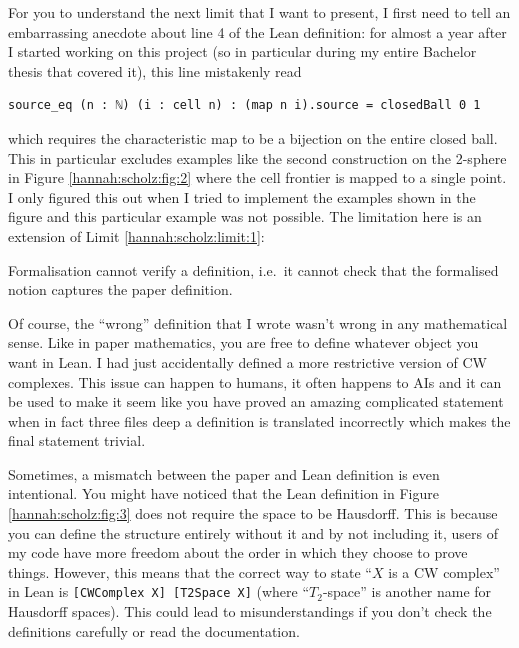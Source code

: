 
For you to understand the next limit that I want to present, I first need to tell an embarrassing anecdote about line 4 of the Lean definition: for almost a year after I started working on this project (so in particular during my entire Bachelor thesis that covered it), this line mistakenly read 
\begin{lstlisting}[language=lean]
source_eq (n : ℕ) (i : cell n) : (map n i).source = closedBall 0 1
\end{lstlisting}
which requires the characteristic map to be a bijection on the entire closed ball. This in particular excludes examples like the second construction on the 2-sphere in Figure \ref{hannah:scholz:fig:2} where the cell frontier is mapped to a single point. 
I only figured this out when I tried to implement the examples shown in the figure and this particular example was not possible. 
The limitation here is an extension of Limit \ref{hannah:scholz:limit:1}: 

\begin{limit}
    Formalisation cannot verify a definition, i.e.\ it cannot check that the formalised notion captures the paper definition. 
\end{limit}

Of course, the ``wrong'' definition that I wrote wasn't wrong in any mathematical sense. Like in paper mathematics, you are free to define whatever object you want in Lean. I had just accidentally defined a more restrictive version of CW complexes. This issue can happen to humans, it often happens to AIs and it can be used to make it seem like you have proved an amazing complicated statement when in fact three files deep a definition is translated incorrectly which makes the final statement trivial. 

Sometimes, a mismatch between the paper and Lean definition is even intentional. You might have noticed that the Lean definition in Figure \ref{hannah:scholz:fig:3} does not require the space to be Hausdorff. This is because you can define the structure entirely without it and by not including it, users of my code have more freedom about the order in which they choose to prove things. However, this means that the correct way to state ``$X$ is a CW complex'' in Lean is \lstinline[language=lean]{[CWComplex X] [T2Space X]} (where ``$T_2$-space'' is another name for Hausdorff spaces). This could lead to misunderstandings if you don't check the definitions carefully or read the documentation. 

